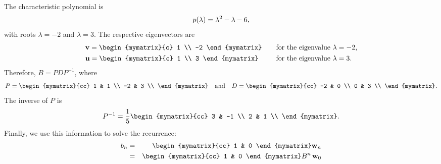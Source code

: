\begin{solution}
  The characteristic polynomial is
  \begin{equation*}
    p(\lambda) = \lambda^2 - \lambda - 6,
  \end{equation*}
  with roots $\lambda=-2$ and $\lambda=3$. The respective eigenvectors
  are 
  \begin{equation*}
    \begin{array}{ll}
      \vect{v} = \begin{mymatrix}{c} 1 \\ -2 \end{mymatrix}
        &\quad\mbox{for the eigenvalue $\lambda=-2$,}\\\\[-2ex]
      \vect{u} = \begin{mymatrix}{c} 1 \\ 3 \end{mymatrix}
        &\quad\mbox{for the eigenvalue $\lambda=3$.}
    \end{array}
  \end{equation*}
  Therefore, $B = PDP^{-1}$, where
  \begin{equation*}
    P = \begin{mymatrix}{cc}
      1 & 1 \\
      -2 & 3 \\
    \end{mymatrix}
    \quad\mbox{and}\quad
    D = \begin{mymatrix}{cc}
      -2 & 0 \\
      0 & 3 \\
    \end{mymatrix}.
  \end{equation*}
  The inverse of $P$ is
  \begin{equation*}
    P^{-1} =
    \frac{1}{5}
    \begin{mymatrix}{cc}
      3 & -1 \\
      2 &  1 \\
    \end{mymatrix}.
  \end{equation*}
  Finally, we use this information to solve the recurrence:
  \begin{eqnarray*}
    b_n
    &=& \begin{mymatrix}{cc} 1 & 0 \end{mymatrix}\vect{w}_n \\
    &=& \begin{mymatrix}{cc} 1 & 0 \end{mymatrix}B^n\,\vect{w}_0 \\

\end{eqnarray*}
\end{solution}
